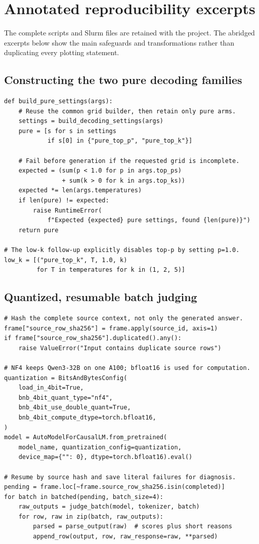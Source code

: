 \documentclass[11pt]{article}
\begin{document}
\section{Annotated reproducibility excerpts}
\label{app:code}

The complete scripts and Slurm files are retained with the project. The
abridged excerpts below show the main safeguards and transformations rather
than duplicating every plotting statement.

\subsection{Constructing the two pure decoding families}

\begin{lstlisting}
def build_pure_settings(args):
    # Reuse the common grid builder, then retain only pure arms.
    settings = build_decoding_settings(args)
    pure = [s for s in settings
            if s[0] in {"pure_top_p", "pure_top_k"}]

    # Fail before generation if the requested grid is incomplete.
    expected = (sum(p < 1.0 for p in args.top_ps)
                + sum(k > 0 for k in args.top_ks))
    expected *= len(args.temperatures)
    if len(pure) != expected:
        raise RuntimeError(
            f"Expected {expected} pure settings, found {len(pure)}")
    return pure

# The low-k follow-up explicitly disables top-p by setting p=1.0.
low_k = [("pure_top_k", T, 1.0, k)
         for T in temperatures for k in (1, 2, 5)]
\end{lstlisting}

\subsection{Quantized, resumable batch judging}

\begin{lstlisting}
# Hash the complete source context, not only the generated answer.
frame["source_row_sha256"] = frame.apply(source_id, axis=1)
if frame["source_row_sha256"].duplicated().any():
    raise ValueError("Input contains duplicate source rows")

# NF4 keeps Qwen3-32B on one A100; bfloat16 is used for computation.
quantization = BitsAndBytesConfig(
    load_in_4bit=True,
    bnb_4bit_quant_type="nf4",
    bnb_4bit_use_double_quant=True,
    bnb_4bit_compute_dtype=torch.bfloat16,
)
model = AutoModelForCausalLM.from_pretrained(
    model_name, quantization_config=quantization,
    device_map={"": 0}, dtype=torch.bfloat16).eval()

# Resume by source hash and save literal failures for diagnosis.
pending = frame.loc[~frame.source_row_sha256.isin(completed)]
for batch in batched(pending, batch_size=4):
    raw_outputs = judge_batch(model, tokenizer, batch)
    for row, raw in zip(batch, raw_outputs):
        parsed = parse_output(raw)  # scores plus short reasons
        append_row(output, row, raw_response=raw, **parsed)
\end{lstlisting}
\end{document}
